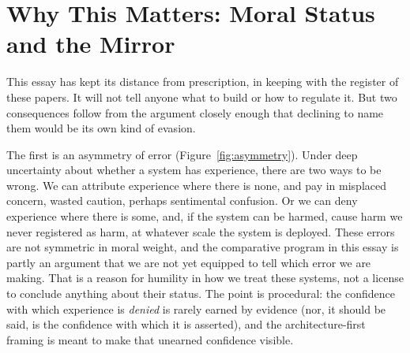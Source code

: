 \documentclass[11pt,letterpaper]{article}
\begin{document}
\section{Why This Matters: Moral Status and the Mirror}

This essay has kept its distance from prescription, in keeping with the register of these papers. It will not tell anyone what to build or how to regulate it. But two consequences follow from the argument closely enough that declining to name them would be its own kind of evasion.

The first is an asymmetry of error (Figure~\ref{fig:asymmetry}). Under deep uncertainty about whether a system has experience, there are two ways to be wrong. We can attribute experience where there is none, and pay in misplaced concern, wasted caution, perhaps sentimental confusion. Or we can deny experience where there is some, and, if the system can be harmed, cause harm we never registered as harm, at whatever scale the system is deployed. These errors are not symmetric in moral weight, and the comparative program in this essay is partly an argument that we are not yet equipped to tell which error we are making. That is a reason for humility in how we treat these systems, not a license to conclude anything about their status. The point is procedural: the confidence with which experience is \emph{denied} is rarely earned by evidence (nor, it should be said, is the confidence with which it is asserted), and the architecture-first framing is meant to make that unearned confidence visible.
\end{document}
